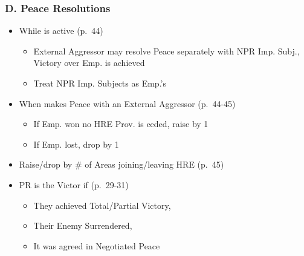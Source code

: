 \documentclass[10pt]{article}
\begin{document}
\subsubsection*{D. Peace Resolutions}
\begin{itemize}
	\item While  is active (p.~44)
	\begin{itemize}
		\item External Aggressor may  resolve Peace separately with NPR Imp. Subj.,  Victory over Emp. is achieved
		\item Treat NPR Imp. Subjects as Emp.'s \activeallies
	\end{itemize}
	\item When  makes Peace with an External Aggressor (p.~44-45)
	\begin{itemize}
		\item If Emp. won  no HRE Prov. is ceded, raise \authority by 1
		\item If Emp. lost, drop \authority by 1
	\end{itemize}
	\item Raise/drop \authority by \# of Areas joining/leaving HRE (p.~45)
	\item PR is the Victor if (p.~29-31)
	\begin{itemize}
		\item They achieved Total/Partial Victory, 
		\item Their Enemy Surrendered, 
		\item It was agreed in Negotiated Peace
	\end{itemize}
\end{itemize}
\end{document}
